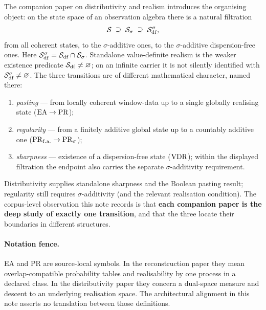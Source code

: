 The companion paper on distributivity and realism introduces the organising
object: on the state space of an observation algebra there is a natural
filtration
\[
  \mathcal{S} \;\supseteq\; \mathcal{S}_\sigma \;\supseteq\; \mathcal{S}_{\mathrm{df}}^\sigma,
\]
from all coherent states, to the $\sigma$-additive ones, to the
$\sigma$-additive dispersion-free ones. Here
$\mathcal{S}_{\mathrm{df}}^\sigma=\mathcal{S}_{\mathrm{df}}\cap\mathcal{S}_\sigma$. Standalone value-definite realism is the weaker
existence predicate $\mathcal{S}_{\mathrm{df}}\ne\varnothing$; on an infinite carrier it is not
silently identified with $\mathcal{S}_{\mathrm{df}}^\sigma\ne\varnothing$. The three transitions are of
different mathematical character, named there:
\begin{enumerate}[label=\textup{(\arabic*)}, itemsep=2pt]
  \item \emph{pasting} --- from locally coherent window-data up to a single
    globally realising state ($\mathrm{EA} \to \mathrm{PR}$);
  \item \emph{regularity} --- from a finitely additive global state up to a
    countably additive one ($\mathrm{PR}_{\mathrm{f.a.}} \to \mathrm{PR}_\sigma$);
  \item \emph{sharpness} --- existence of a dispersion-free state
    ($\mathrm{VDR}$); within the displayed filtration the endpoint also carries the
    separate $\sigma$-additivity requirement.
\end{enumerate}
Distributivity supplies standalone sharpness and the Boolean pasting result;
regularity still requires $\sigma$-additivity (and the relevant realisation
condition). The corpus-level observation this note records is that
\textbf{each companion paper is the deep study of exactly one transition}, and
that the three locate their boundaries in different structures.

\paragraph{Notation fence.} EA and PR are source-local symbols. In the
reconstruction paper they mean overlap-compatible probability tables and
realisability by one process in a declared class. In the distributivity paper
they concern a dual-space measure and descent to an underlying realisation
space. The architectural alignment in this note asserts no translation between
those definitions.

